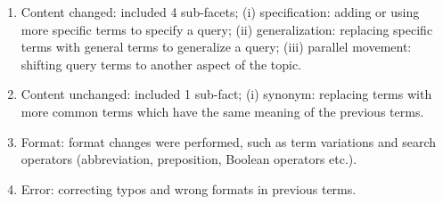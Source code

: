 \documentclass[]{article}
\begin{document}
\begin{enumerate}
	\item Content changed: included 4 sub-facets; (i) specification: adding or using more specific terms to specify a query; (ii) generalization: replacing specific terms with general terms to generalize a query; (iii) parallel movement: shifting query terms to another aspect of the topic.
	\item Content unchanged: included 1 sub-fact; (i) synonym: replacing terms with more common terms which have the same meaning of the previous terms.
	\item  Format: format changes were performed, such as term variations and search operators (abbreviation, preposition, Boolean operators etc.).
	\item  Error: correcting typos and wrong formats in previous terms. 
\end{enumerate}
\end{document}
